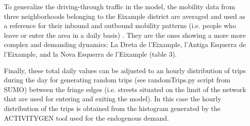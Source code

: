 \documentclass[11pt]{article}
\begin{document}
To generalize the driving-through traffic in the model, the mobility data from three neighborhoods belonging to the Eixample district are averaged and used as a reference for their inbound and outbound mobility patterns (i.e. people who leave or enter the area in a daily basis) \citep{BestiarioProyectosS.L.2014}. They are the ones showing a more more complex and demanding dynamics: La Dreta de l'Eixample, l'Antiga Esquerra de l'Eixample, and la Nova Esquerra de l'Eixample (table 3).

\begin{table}[htbp!]
\centering
\caption{Demographic and mobility data from referenced neighborhoods and used in model.}
\label{tab-hoods-ref}
\end{table}

Finally, these total daily values can be adjusted to an hourly distribution of trips during the day for generating random trips (see randomTrips.py script from SUMO) between the fringe edges (i.e. streets situated on the limit of the network that are used for entering and exiting the model). In this case the hourly distribution of the trips is obtained from the histogram generated by the ACTIVITYGEN tool used for the endogenous demand. 
\end{document}
